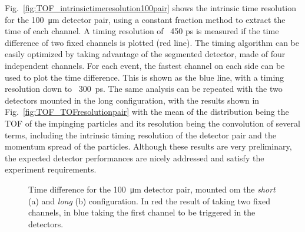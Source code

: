 \begin{refsection}
        \noindent
        Fig.~\ref{fig:TOF_intrinsictimeresolution100pair} shows the intrinsic time resolution for the \SI{100}{\micro m} detector pair, using a constant fraction method to extract the time of each channel. 
        A timing resolution of ~450 ps is measured if the time difference of two fixed channels is plotted (red line). 
        The timing algorithm can be easily optimized by taking advantage of the segmented detector, made of four independent channels. 
        For each event, the fastest channel on each side can be used to plot the time difference. 
        This is shown as the blue line, with a timing resolution down to ~\SI{300}{ps}. 
        The same analysis can be repeated with the two detectors mounted in the long configuration, with the results shown in Fig.~\ref{fig:TOF_TOFresolutionpair} with the mean of the distribution being the TOF of the impinging particles and its resolution being the convolution of several terms, including the intrinsic timing resolution of the detector pair and the momentum spread of the particles.
        \noindent
        Although these results are very preliminary, the expected detector performances are nicely addressed and satisfy the experiment requirements.


        \begin{figure}
            \centering 
            \caption[muEDM 2023: TOF resolutions]{Time difference for the \SI{100}{\micro m} detector pair, mounted om the \textit{short} (a) and \textit{long} (b) configuration. In red the result of taking two fixed channels, in blue taking the first channel to be triggered in the detectors.}
        \end{figure}


\end{refsection}
